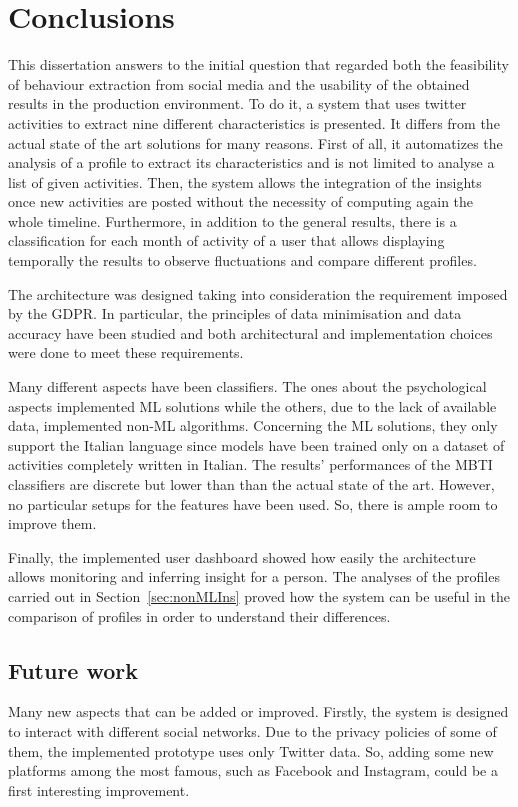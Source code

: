 \chapter{Conclusions}
This dissertation answers to the initial question that regarded both the feasibility of behaviour extraction from social media and the usability of the obtained results in the production environment.
To do it, a system that uses twitter activities to extract nine different characteristics is presented.
It differs from the actual state of the art solutions for many reasons. First of all, it automatizes the analysis of a profile to extract its characteristics and is not limited to analyse a list of given activities.
Then, the system allows the integration of the insights once new activities are posted without the necessity of computing again the whole timeline.
Furthermore, in addition to the general results, there is a classification for each month of activity of a user that allows displaying temporally the results to observe fluctuations and compare different profiles.

The architecture was designed taking into consideration the requirement imposed by the GDPR.
In particular, the principles of data minimisation and data accuracy have been studied and both architectural and implementation choices were done to meet these requirements.

Many different aspects have been classifiers. The ones about the psychological aspects implemented ML solutions while the others, due to the lack of available data, implemented non-ML algorithms.
Concerning the ML solutions, they only support the Italian language since models have been trained only on a dataset of activities completely written in Italian.
The results' performances of the MBTI classifiers are discrete but lower than than the actual state of the art. However, no particular setups for the features have been used. So, there is ample room to improve them. 

Finally, the implemented user dashboard showed how easily the architecture allows monitoring and inferring insight for a person.
The analyses of the profiles carried out in Section~\ref{sec:nonMLIns} proved how the system can be useful in the comparison of profiles in order to understand their differences.

\section{Future work}
Many new aspects that can be added or improved.
Firstly, the system is designed to interact with different social networks. Due to the privacy policies of some of them, the implemented prototype uses only Twitter data.
So, adding some new platforms among the most famous, such as Facebook and Instagram, could be a first interesting improvement.


